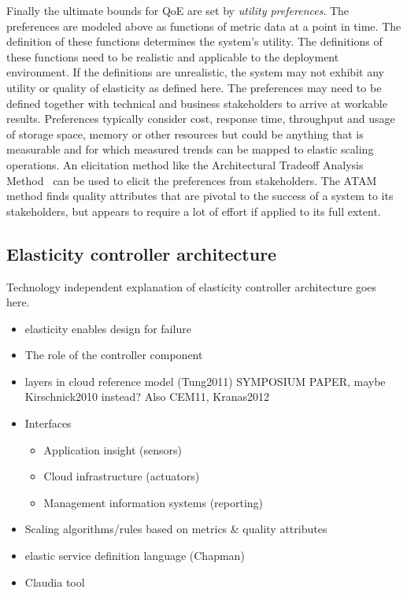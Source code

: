 \documentclass[english]{tktltiki2}
\theoremstyle{definition}
\theoremstyle{remark}
\begin{document}
Finally the ultimate bounds for QoE are set by \textit{utility preferences}. The
preferences are modeled above as functions of metric data at a point in time.
The definition of these functions determines the system's utility. The
definitions of these functions need to be realistic and applicable to the
deployment environment. If the definitions are unrealistic, the system may not
exhibit any utility or quality of elasticity as defined here.  The preferences
may need to be defined together with technical and business stakeholders to
arrive at workable results. Preferences typically consider cost, response time,
throughput and usage of storage space, memory or other resources but could be
anything that is measurable and for which measured trends can be mapped to
elastic scaling operations. An elicitation method like the Architectural
Tradeoff Analysis Method~\cite{ATAM} can be used to elicit the preferences from
stakeholders. The ATAM method finds quality attributes that are pivotal to the
success of a system to its stakeholders, but appears to require a lot of effort
if applied to its full extent.

\subsection{Elasticity controller architecture}

Technology independent explanation of elasticity controller architecture goes here.

\begin{itemize}
\item elasticity enables design for failure
\item The role of the controller component
\item layers in cloud reference model (Tung2011) SYMPOSIUM PAPER, maybe Kirschnick2010 instead? Also CEM11, Kranas2012
\item Interfaces
	\begin{itemize}
	\item Application insight (sensors)
	\item Cloud infrastructure (actuators)
	\item Management information systems (reporting)
	\end{itemize}
\item Scaling algorithms/rules based on metrics \& quality attributes
\item elastic service definition language (Chapman)
\item Claudia tool
\end{itemize}
\end{document}
